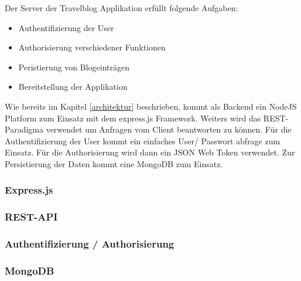 \documentclass[../main.tex]{subfiles}
\begin{document}
Der Server der Travelblog Applikation erfüllt folgende Aufgaben:
\begin{itemize}
    \item Authentifizierung der User
    \item Authorisierung verschiedener Funktionen
    \item Peristierung von Blogeinträgen
    \item Bereitstellung der Applikation
\end{itemize}
Wie bereits im Kapitel \ref{architektur} beschrieben, kommt als Backend ein NodeJS Platform zum Einsatz mit dem express.js Framework. Weiters wird das REST- Paradigma verwendet um Anfragen vom Client beantworten zu können. Für die Authentifizierung der User kommt ein einfaches User/ Passwort abfrage zum Einsatz. Für die Authorisierung wird dann ein JSON Web Token verwendet. Zur Persistierung der Daten kommt eine MongoDB zum Einsatz.

\subsubsection{Express.js}

\subsubsection{REST-API}


\subsubsection{Authentifizierung / Authorisierung}

\subsubsection{MongoDB}
\end{document}
